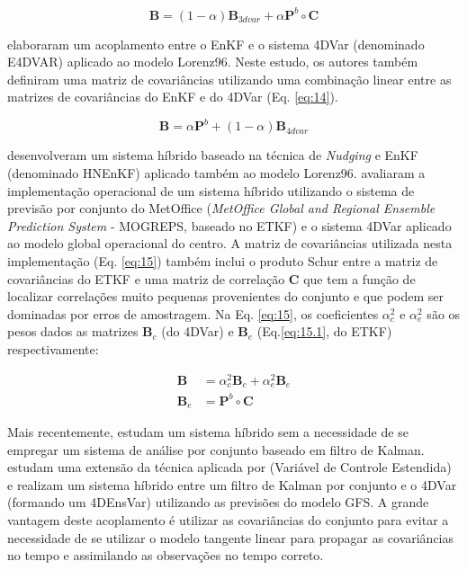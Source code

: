 \begin{equation}
\label{eq:13}
\mathbf{B}=(1-\alpha)\mathbf{B}_{3dvar}+\alpha\mathbf{P}^{b}\circ\mathbf{C}
\end{equation}

 elaboraram um acoplamento entre o EnKF e o sistema 4DVar (denominado E4DVAR) aplicado ao modelo Lorenz96. Neste estudo, os autores também definiram uma matriz de covariâncias utilizando uma combinação linear entre as matrizes de covariâncias do EnKF e do 4DVar (Eq. \ref{eq:14}).

\begin{equation}
\label{eq:14}
\mathbf{B}=\alpha\mathbf{P}^{b}+(1-\alpha)\mathbf{B}_{4dvar}
\end{equation}

 desenvolveram um sistema híbrido baseado na técnica de \textit{Nudging} e EnKF (denominado HNEnKF) aplicado também ao modelo Lorenz96.  avaliaram a implementação operacional de um sistema híbrido utilizando o sistema de previsão por conjunto do MetOffice (\textit{MetOffice Global and Regional Ensemble Prediction System} - MOGREPS, baseado no ETKF) e o sistema 4DVar aplicado ao modelo global operacional do centro. A matriz de covariâncias utilizada nesta implementação (Eq. \ref{eq:15}) também inclui o produto Schur entre a matriz de covariâncias do ETKF e uma matriz de correlação $\mathbf{C}$ que tem a função de localizar correlações muito pequenas provenientes do conjunto e que podem ser dominadas por erros de amostragem. Na Eq. \ref{eq:15}, os coeficientes $\alpha_{c}^{2}$ e $\alpha_{e}^{2}$ são os pesos dados as matrizes $\mathbf{B}_{c}$ (do 4DVar) e $\mathbf{B}_{e}$ (Eq.\ref{eq:15.1}, do ETKF) respectivamente:

\begin{align}
\label{eq:15}
\mathbf{B} & = {} \alpha_{c}^{2}\mathbf{B}_{c}+\alpha_{e}^{2}\mathbf{B}_{e} \\
\label{eq:15.1}
\mathbf{B}_{e} & = {} \mathbf{P}^{b} \circ \mathbf{C}
\end{align}

Mais recentemente,  estudam um sistema híbrido sem a necessidade de se empregar um sistema de análise por conjunto baseado em filtro de Kalman.  estudam uma extensão da técnica aplicada por  (Variável de Controle Estendida) e realizam um sistema híbrido entre um filtro de Kalman por conjunto e o 4DVar (formando um 4DEnsVar) utilizando as previsões do modelo GFS. A grande vantagem deste acoplamento é utilizar as covariâncias do conjunto para evitar a necessidade de se utilizar o modelo tangente linear para propagar as covariâncias no tempo e assimilando as observações no tempo correto.

